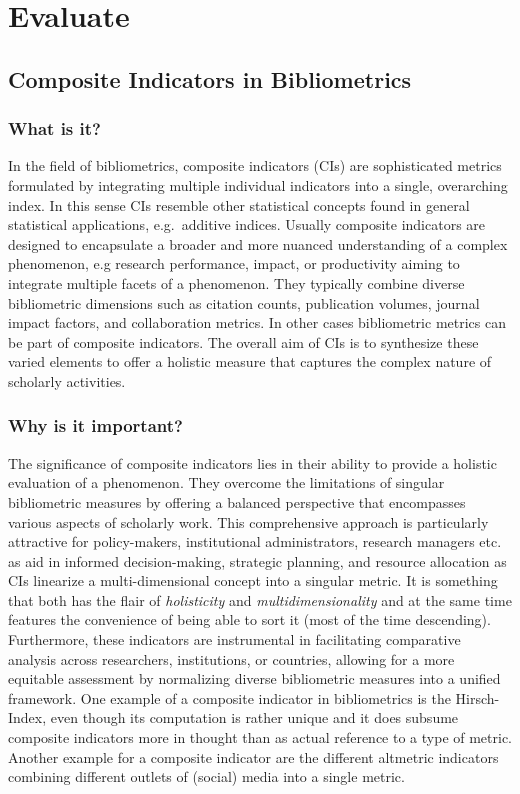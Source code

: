 \documentclass[
  letterpaper,
]{scrreprt}
\begin{document}
\part{Evaluate}

\chapter{Composite Indicators in
Bibliometrics}\label{composite-indicators-in-bibliometrics}

\section{What is it?}\label{what-is-it}

In the field of bibliometrics, composite indicators (CIs) are
sophisticated metrics formulated by integrating multiple individual
indicators into a single, overarching index. In this sense CIs resemble
other statistical concepts found in general statistical applications,
e.g.~additive indices. Usually composite indicators are designed to
encapsulate a broader and more nuanced understanding of a complex
phenomenon, e.g research performance, impact, or productivity aiming to
integrate multiple facets of a phenomenon. They typically combine
diverse bibliometric dimensions such as citation counts, publication
volumes, journal impact factors, and collaboration metrics. In other
cases bibliometric metrics can be part of composite indicators. The
overall aim of CIs is to synthesize these varied elements to offer a
holistic measure that captures the complex nature of scholarly
activities.

\section{Why is it important?}\label{why-is-it-important-4}

The significance of composite indicators lies in their ability to
provide a holistic evaluation of a phenomenon. They overcome the
limitations of singular bibliometric measures by offering a balanced
perspective that encompasses various aspects of scholarly work. This
comprehensive approach is particularly attractive for policy-makers,
institutional administrators, research managers etc. as aid in informed
decision-making, strategic planning, and resource allocation as CIs
linearize a multi-dimensional concept into a singular metric. It is
something that both has the flair of \emph{holisticity} and
\emph{multidimensionality} and at the same time features the convenience
of being able to sort it (most of the time descending). Furthermore,
these indicators are instrumental in facilitating comparative analysis
across researchers, institutions, or countries, allowing for a more
equitable assessment by normalizing diverse bibliometric measures into a
unified framework. One example of a composite indicator in bibliometrics
is the Hirsch-Index, even though its computation is rather unique and it
does subsume composite indicators more in thought than as actual
reference to a type of metric. Another example for a composite indicator
are the different altmetric indicators combining different outlets of
(social) media into a single metric.
\end{document}
